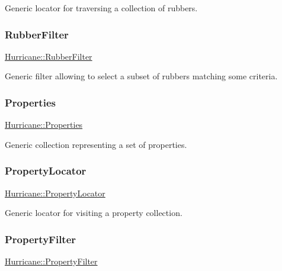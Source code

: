 Generic locator for traversing a collection of rubbers. \mbox{\label{namespaceHurricane_ae331d428a7e324593e4a47dac023b7f0}} 
\subsubsection{\texorpdfstring{Rubber\+Filter}{RubberFilter}}
{\footnotesize\ttfamily \mbox{\hyperlink{namespaceHurricane_ae331d428a7e324593e4a47dac023b7f0}{Hurricane\+::\+Rubber\+Filter}}}

Generic filter allowing to select a subset of rubbers matching some criteria. \mbox{\label{namespaceHurricane_afd7bca6dad4be54b7c03b0463e6c0004}} 
\subsubsection{\texorpdfstring{Properties}{Properties}}
{\footnotesize\ttfamily \mbox{\hyperlink{namespaceHurricane_afd7bca6dad4be54b7c03b0463e6c0004}{Hurricane\+::\+Properties}}}

Generic collection representing a set of properties. \mbox{\label{namespaceHurricane_a91d71616b5784225dfd4296487e49c07}} 
\subsubsection{\texorpdfstring{Property\+Locator}{PropertyLocator}}
{\footnotesize\ttfamily \mbox{\hyperlink{namespaceHurricane_a91d71616b5784225dfd4296487e49c07}{Hurricane\+::\+Property\+Locator}}}

Generic locator for visiting a property collection. \mbox{\label{namespaceHurricane_a9e98e66d188d506145a5e92045691777}} 
\subsubsection{\texorpdfstring{Property\+Filter}{PropertyFilter}}
{\footnotesize\ttfamily \mbox{\hyperlink{namespaceHurricane_a9e98e66d188d506145a5e92045691777}{Hurricane\+::\+Property\+Filter}}}

